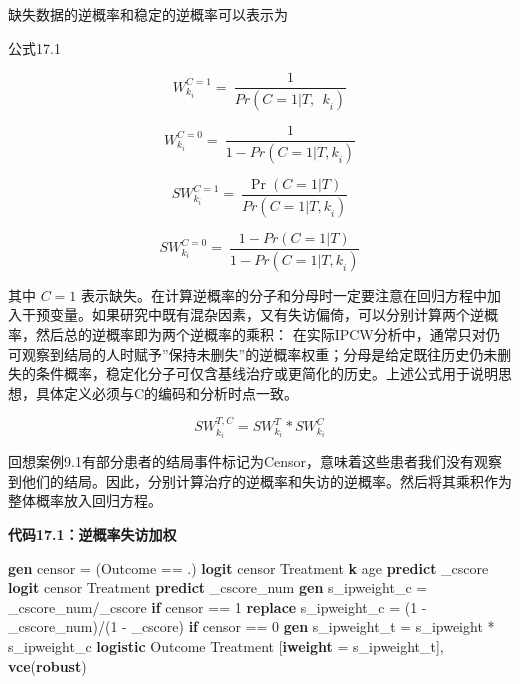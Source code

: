 \documentclass[
  chinese-hans,
  letterpaper,
  DIV=11,
  numbers=noendperiod]{scrreprt}
\newenvironment{Shaded}{\begin{snugshade}}{\end{snugshade}}
\newcommand{\KeywordTok}[1]{\textcolor[rgb]{0.00,0.23,0.31}{\textbf{#1}}}
\newcommand{\NormalTok}[1]{\textcolor[rgb]{0.00,0.23,0.31}{#1}}
\begin{document}
缺失数据的逆概率和稳定的逆概率可以表示为

公式17.1

\[W_{k_{i}}^{C = 1} = \ \frac{1}{Pr(C = 1|{T,\ \ k}_{i})}\]

\[W_{k_{i}}^{C = 0} = \ \frac{1}{1 - Pr(C = 1|{T,k}_{i})}\]

\[{SW}_{k_{i}}^{C = 1} = \ \frac{\Pr(C = 1|T)}{Pr(C = 1|{T,k}_{i})}\]

\[{SW}_{k_{i}}^{C = 0} = \ \frac{1 - Pr(C = 1|T)}{1 - Pr(C = 1|{T,k}_{i})}\]

其中 \(C = 1\)
表示缺失。在计算逆概率的分子和分母时一定要注意在回归方程中加入干预变量。如果研究中既有混杂因素，又有失访偏倚，可以分别计算两个逆概率，然后总的逆概率即为两个逆概率的乘积：
在实际IPCW分析中，通常只对仍可观察到结局的人时赋予''保持未删失''的逆概率权重；分母是给定既往历史仍未删失的条件概率，稳定化分子可仅含基线治疗或更简化的历史。上述公式用于说明思想，具体定义必须与C的编码和分析时点一致。

\[{SW}_{k_{i}}^{T,C} = {SW}_{k_{i}}^{T}*{SW}_{k_{i}}^{C}\]

回想案例9.1有部分患者的结局事件标记为Censor，意味着这些患者我们没有观察到他们的结局。因此，分别计算治疗的逆概率和失访的逆概率。然后将其乘积作为整体概率放入回归方程。

\begin{tcolorbox}[enhanced jigsaw, arc=.35mm, bottomrule=.15mm, breakable, colback=white, colframe=quarto-callout-note-color-frame, left=2mm, leftrule=.75mm, opacityback=0, rightrule=.15mm, toprule=.15mm]

\vspace{-3mm}\textbf{代码17.1：逆概率失访加权}\vspace{3mm}

\begin{Shaded}
\begin{Highlighting}[]
\KeywordTok{gen}\NormalTok{ censor = (Outcome == .)}
\KeywordTok{logit}\NormalTok{ censor Treatment }\KeywordTok{k}\NormalTok{ age}
\KeywordTok{predict}\NormalTok{ \_cscore}
\KeywordTok{logit}\NormalTok{ censor Treatment}
\KeywordTok{predict}\NormalTok{ \_cscore\_num}
\KeywordTok{gen}\NormalTok{ s\_ipweight\_c = \_cscore\_num/\_cscore }\KeywordTok{if}\NormalTok{ censor == 1}
\KeywordTok{replace}\NormalTok{ s\_ipweight\_c = (1 {-} \_cscore\_num)/(1 {-} \_cscore) }\KeywordTok{if}\NormalTok{ censor == 0}
\KeywordTok{gen}\NormalTok{ s\_ipweight\_t = s\_ipweight * s\_ipweight\_c}
\KeywordTok{logistic}\NormalTok{ Outcome Treatment [}\KeywordTok{iweight}\NormalTok{ = s\_ipweight\_t], }\KeywordTok{vce}\NormalTok{(}\KeywordTok{robust}\NormalTok{)}
\end{Highlighting}
\end{Shaded}

\end{tcolorbox}
\end{document}
